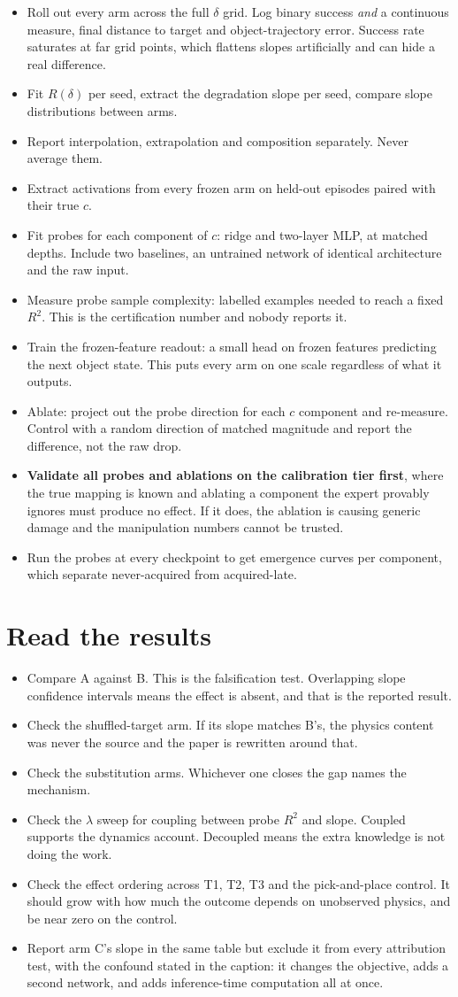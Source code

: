 \documentclass[9pt]{extarticle}
\newcommand{\ck}{\item[$\square$]}
\begin{document}
\begin{itemize}
\ck Roll out every arm across the full $\delta$ grid. Log binary success \emph{and} a continuous measure, final distance to target and object-trajectory error. Success rate saturates at far grid points, which flattens slopes artificially and can hide a real difference.
\ck Fit $R(\delta)$ per seed, extract the degradation slope per seed, compare slope distributions between arms.
\ck Report interpolation, extrapolation and composition separately. Never average them.
\ck Extract activations from every frozen arm on held-out episodes paired with their true $c$.
\ck Fit probes for each component of $c$: ridge and two-layer MLP, at matched depths. Include two baselines, an untrained network of identical architecture and the raw input.
\ck Measure probe sample complexity: labelled examples needed to reach a fixed $R^2$. This is the certification number and nobody reports it.
\ck Train the frozen-feature readout: a small head on frozen features predicting the next object state. This puts every arm on one scale regardless of what it outputs.
\ck Ablate: project out the probe direction for each $c$ component and re-measure. Control with a random direction of matched magnitude and report the difference, not the raw drop.
\ck \textbf{Validate all probes and ablations on the calibration tier first}, where the true mapping is known and ablating a component the expert provably ignores must produce no effect. If it does, the ablation is causing generic damage and the manipulation numbers cannot be trusted.
\ck Run the probes at every checkpoint to get emergence curves per component, which separate never-acquired from acquired-late.
\end{itemize}

\section{Read the results}

\begin{itemize}
\ck Compare A against B. This is the falsification test. Overlapping slope confidence intervals means the effect is absent, and that is the reported result.
\ck Check the shuffled-target arm. If its slope matches B's, the physics content was never the source and the paper is rewritten around that.
\ck Check the substitution arms. Whichever one closes the gap names the mechanism.
\ck Check the $\lambda$ sweep for coupling between probe $R^2$ and slope. Coupled supports the dynamics account. Decoupled means the extra knowledge is not doing the work.
\ck Check the effect ordering across T1, T2, T3 and the pick-and-place control. It should grow with how much the outcome depends on unobserved physics, and be near zero on the control.
\ck Report arm C's slope in the same table but exclude it from every attribution test, with the confound stated in the caption: it changes the objective, adds a second network, and adds inference-time computation all at once.
\end{itemize}
\end{document}
